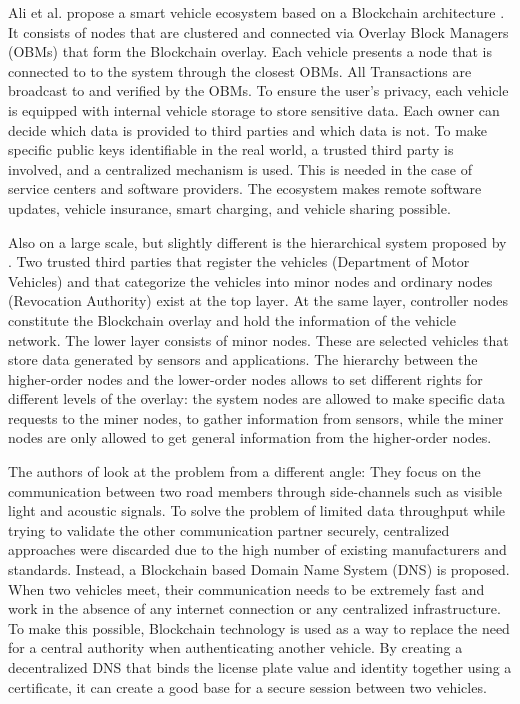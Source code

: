 Ali et al. propose a smart vehicle ecosystem based on a Blockchain architecture \cite{DorriSteger2017}. It consists of nodes that are clustered and connected via Overlay Block Managers (OBMs) that form the Blockchain overlay. Each vehicle presents a node that is connected to to the system through the closest OBMs. All Transactions are broadcast to and verified by the OBMs.
To ensure the user's privacy, each vehicle is equipped with internal vehicle storage to store sensitive data. Each owner can decide which data is provided to third parties and which data is not.
To make specific public keys identifiable in the real world, a trusted third party is involved, and a centralized mechanism is used. This is needed in the case of service centers and software providers. The ecosystem makes remote software updates, vehicle insurance, smart charging, and vehicle sharing possible.

Also on a large scale, but slightly different is the hierarchical system proposed by \cite{Sharma2017}. Two trusted third parties that register the vehicles (Department of Motor Vehicles) and that categorize the vehicles into minor nodes and ordinary nodes (Revocation Authority) exist at the top layer. At the same layer, controller nodes constitute the Blockchain overlay and hold the information of the vehicle network. The lower layer consists of minor nodes. These are selected vehicles that store data generated by sensors and applications.
The hierarchy between the higher-order nodes and the lower-order nodes allows to set different rights for different levels of the overlay: the system nodes are allowed to make specific data requests to the miner nodes, to gather information from sensors, while the miner nodes are only allowed to get general information from the higher-order nodes.

The authors of \cite{Rowan2017} look at the problem from a different angle: They focus on the communication between two road members through side-channels such as visible light and acoustic signals. To solve the problem of limited data throughput while trying to validate the other communication partner securely, centralized approaches were discarded due to the high number of existing manufacturers and standards. Instead, a Blockchain based Domain Name System (DNS) is proposed.
When two vehicles meet, their communication needs to be extremely fast and work in the absence of any internet connection or any centralized infrastructure.
To make this possible, Blockchain technology is used as a way to replace the need for a central authority when authenticating another vehicle. By creating a decentralized DNS that binds the license plate value and identity together using a certificate, it can create a good base for a secure session between two vehicles.

